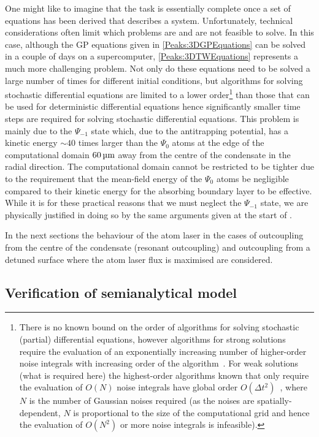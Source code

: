 One might like to imagine that the task is essentially complete once a set of equations has been derived that describes a system. Unfortunately, technical considerations often limit which problems are and are not feasible to solve. In this case, although the GP equations given in \eqref{Peaks:3DGPEquations} can be solved in a couple of days on a supercomputer, \eqref{Peaks:3DTWEquations} represents a much more challenging problem. Not only do these equations need to be solved a large number of times for different initial conditions, but algorithms for solving stochastic differential equations are limited to a lower order\footnote{There is no known bound on the order of algorithms for solving stochastic (partial) differential equations, however algorithms for strong solutions require the evaluation of an exponentially increasing number of higher-order noise integrals with increasing order of the algorithm~\citep{Burrage:1997}. For weak solutions (what is required here) the highest-order algorithms known that only require the evaluation of $O(N)$ noise integrals have global order $O(\Delta t^2)$~\citep{Rosler:2007,Rosler:2009}, where $N$ is the number of Gaussian noises required (as the noises are spatially-dependent, $N$ is proportional to the size of the computational grid and hence the evaluation of $O(N^2)$ or more noise integrals is infeasible).} than those that can be used for deterministic differential equations hence significantly smaller time steps are required for solving stochastic differential equations. This problem is mainly due to the $\Psi_{-1}$ state which, due to the antitrapping potential, has a kinetic energy $\sim 40$ times larger than the $\Psi_{0}$ atoms at the edge of the computational domain $\unit[60]{\micro m}$ away from the centre of the condensate in the radial direction. The computational domain cannot be restricted to be tighter due to the requirement that the mean-field energy of the $\Psi_{0}$ atoms be negligible compared to their kinetic energy for the absorbing boundary layer to be effective. While it is for these practical reasons that we must neglect the $\Psi_{-1}$ state, we are physically justified in doing so by the same arguments given at the start of . 

In the next sections the behaviour of the atom laser in the cases of outcoupling from the centre of the condensate (resonant outcoupling) and outcoupling from a detuned surface where the atom laser flux is maximised are considered.

\subsection{Verification of semianalytical model}

